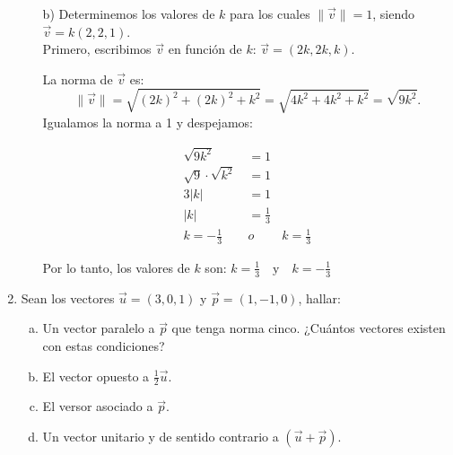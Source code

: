 \documentclass[11pt,a4paper]{article}
\begin{document}
\begin{enumerate}[\hspace{-5mm} 1) ]
\begin{itemize}
\bigskip



    \item[b)] Determinemos los valores de $k$ para los cuales $\|\vec{v}\| = 1$, siendo $\vec{v} = k(2, 2, 1)$. \\
    Primero, escribimos $\vec{v}$ en función de $k$: \quad $\vec{v} = (2k, 2k, k).$
   
    La norma de $\vec{v}$ es:
    \[
    \|\vec{v}\| = \sqrt{(2k)^2 + (2k)^2 + k^2} = \sqrt{4k^2 + 4k^2 + k^2} = \sqrt{9k^2}.
    \]
    Igualamos la norma a 1 y despejamos:

\begin{minipage}{.45\textwidth}
      \begin{align*}
    \sqrt{9k^2} &= 1
    \\[3mm]
     \sqrt{9 } \cdot   \sqrt{k^2} &= 1  
    \\[3mm]   
    3 |k| &= 1  
    \\[3mm]
    |k| &= \tfrac{1}{3}
    \\[3mm]%
     k = - \tfrac{1}{3}\ \quad &o \qquad  \ k=\tfrac{1}{3} 
    \end{align*}
     

\end{minipage}



    Por lo tanto, los valores de $k$ son: \quad $k = \tfrac{1}{3} \quad \text{y} \quad k = -\tfrac{1}{3}$
    
\end{itemize}

\medskip 












    \item  Sean los vectores $\vec{u} = (3, 0, 1)$ y $\vec{p} = (1, -1, 0)$, hallar:

\begin{enumerate}[a)]
    \item Un vector paralelo a $\vec{p}$ que tenga norma cinco. ¿Cuántos vectores existen con estas condiciones?
    \item El vector opuesto a $\tfrac{1}{2}\vec{u}$.
    \item El versor asociado a $\vec{p}$.
    \item  Un vector unitario y de sentido contrario a $(\vec{u} + \vec{p})$. 
\end{enumerate}


\end{enumerate}
\end{document}
